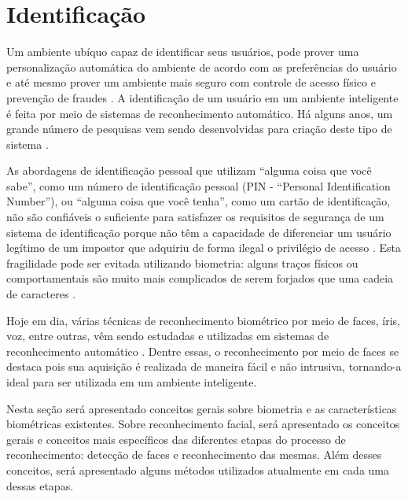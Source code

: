 	

\section{Identificação}
	
	Um ambiente ubíquo capaz de identificar seus usuários, pode prover uma
	personalização automática do ambiente de acordo com as preferências do usuário e
	até mesmo prover um ambiente mais seguro com controle de acesso físico e
	prevenção de fraudes \cite{saocarlos}. A identificação de um usuário em um
	ambiente inteligente é feita por meio de sistemas de reconhecimento automático.
	Há alguns anos, um grande número de pesquisas vem sendo desenvolvidas para criação
	deste tipo de sistema  \cite{saocarlos}.
	
	As abordagens de identificação pessoal que utilizam ``alguma coisa que você
	sabe'', como um número de identificação pessoal (PIN - ``Personal
	Identification Number''), ou ``alguma coisa que você tenha'', como um cartão de identificação,
	não são confiáveis o suficiente para satisfazer os requisitos de segurança de um
	sistema de identificação porque não têm a capacidade de diferenciar um usuário
	legítimo de um impostor que adquiriu de forma ilegal o privilégio de acesso
	\cite{hong}. Esta fragilidade pode ser evitada utilizando biometria: alguns
	traços físicos ou comportamentais são muito mais complicados de serem forjados
	que uma cadeia de caracteres \cite{drovetto}.
	
	Hoje em dia, várias técnicas de reconhecimento biométrico por meio de faces,
	íris, voz, entre outras, vêm sendo estudadas e utilizadas em sistemas de
	reconhecimento automático \cite{bolle}. Dentre essas, o reconhecimento por meio
	de faces se destaca pois sua aquisição é realizada de maneira fácil e não
	intrusiva, tornando-a ideal para ser utilizada em um ambiente inteligente.
	
	Nesta seção será apresentado conceitos gerais sobre biometria e as
	características biométricas existentes. Sobre reconhecimento facial, será
	apresentado os conceitos gerais e conceitos mais específicos das diferentes etapas do processo de reconhecimento: detecção
	de faces e reconhecimento das mesmas. Além desses conceitos, será apresentado
	alguns métodos utilizados atualmente em cada uma dessas etapas.


	
	






























